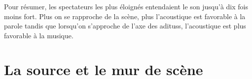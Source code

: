 
Pour résumer, les spectateurs les plus éloignés entendaient le son jusqu'à dix fois moins fort. Plus on se rapproche de la scène, plus l'acoustique est favorable à la parole tandis que lorsqu'on s'approche de l'axe des \glspl{aditus}, l'acoustique est plus favorable à la musique.

\section{La source et le mur de scène}

